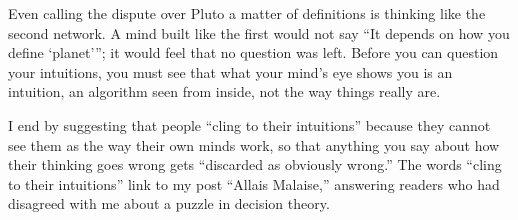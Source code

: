 Even calling the dispute over Pluto a matter of definitions is thinking like the second network. A mind built like the first would not say ``It depends on how you define `planet'''; it would feel that no question was left. Before you can question your intuitions, you must see that what your mind's eye shows you is an intuition, an algorithm seen from inside, not the way things really are.

I end by suggesting that people ``cling to their intuitions'' because they cannot see them as the way their own minds work, so that anything you say about how their thinking goes wrong gets ``discarded as obviously wrong.'' The words ``cling to their intuitions'' link to my post ``Allais Malaise,'' answering readers who had disagreed with me about a puzzle in decision theory. 
